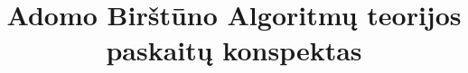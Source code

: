 \documentclass{report}
\title{%
Adomo Birštūno
Algoritmų teorijos paskaitų konspektas}
\author{}
\theoremstyle{plain}
\theoremstyle{definition}
\theoremstyle{remark}
\theoremstyle{notation}
\begin{document}
\maketitle
\bigskip

\tableofcontents

\end{document}
